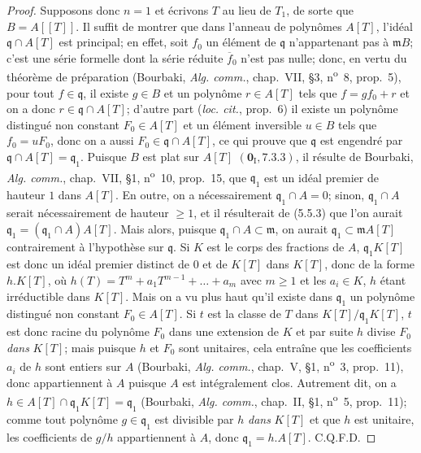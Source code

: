 \begin{proof}
Supposons donc $n=1$ et écrivons $T$ au lieu de $T_1$, de sorte que $B=A[[T]]$. Il
suffit de montrer que dans l'anneau de polynômes $A[T]$, l'idéal
$\mathfrak q\cap A[T]$ est principal;
en effet, soit $f_0$ un élément de $\mathfrak q$ n'appartenant pas à $\mathfrak mB$;
c'est une série formelle dont la série réduite $\overline f_0$ n'est pas nulle; donc,
en vertu du théorème de préparation (Bourbaki, \emph{Alg. comm.}, chap.~VII, \S3,
n\textsuperscript{o}~8, prop.~5), pour tout $f\in\mathfrak q$, il existe $g\in B$ et
un polynôme $r\in A[T]$ tels que $f=gf_0+r$ et on a donc
$r\in\mathfrak q\cap A[T]$; d'autre part (\emph{loc. cit.}, prop.~6) il existe un
polynôme distingué non constant $F_0\in A[T]$ et un élément inversible $u\in B$ tels
que $f_0=uF_0$, donc on a aussi $F_0\in\mathfrak q\cap A[T]$, ce qui prouve que
$\mathfrak q$ est engendré par $\mathfrak q\cap A[T]=\mathfrak q_1$. Puisque $B$
est plat sur $A[T]$ $(\mathbf 0_{\mathrm I}, 7.3.3)$, il résulte de Bourbaki,
\emph{Alg. comm.}, chap.~VII, \S1, n\textsuperscript{o}~10, prop.~15, que
$\mathfrak q_1$ est un idéal premier de hauteur $1$ dans $A[T]$.
En outre, on a nécessairement $\mathfrak q_1\cap A=0$; sinon,
$\mathfrak q_1\cap A$ serait nécessairement de hauteur $\geq1$, et il résulterait de
(5.5.3) que l'on aurait $\mathfrak q_1=(\mathfrak q_1\cap A)A[T]$. Mais alors,
puisque $\mathfrak q_1\cap A\subset\mathfrak m$, on aurait
$\mathfrak q_1\subset\mathfrak mA[T]$ contrairement à l'hypothèse sur
$\mathfrak q$. Si $K$ est le corps des fractions de $A$, $\mathfrak q_1K[T]$ est
donc un idéal premier distinct de $0$ et de $K[T]$ dans $K[T]$, donc de la forme
$h.K[T]$, où $h(T)=T^m+a_1T^{m-1}+\ldots+a_m$ avec $m\geq1$
et les $a_i\in K$, $h$ étant irréductible dans $K[T]$. Mais on a vu plus haut qu'il
existe dans $\mathfrak q_1$ un polynôme distingué non constant $F_0\in A[T]$. Si $t$
est la classe de $T$ dans $K[T]/\mathfrak q_1K[T]$, $t$ est donc racine du polynôme
$F_0$ dans une extension de $K$ et par suite $h$ divise $F_0$ \emph{dans} $K[T]$; mais
puisque $h$ et $F_0$ sont unitaires, cela entraîne que les coefficients $a_i$ de $h$
sont entiers sur $A$ (Bourbaki, \emph{Alg. comm.}, chap.~V, \S1,
n\textsuperscript{o}~3, prop.~11), donc appartiennent à $A$ puisque $A$ est
intégralement clos. Autrement dit, on a $h\in A[T]\cap\mathfrak q_1K[T]=\mathfrak q_1$
(Bourbaki, \emph{Alg. comm.}, chap.~II, \S1, n\textsuperscript{o}~5, prop.~11);
comme tout polynôme $g\in\mathfrak q_1$ est divisible par $h$ \emph{dans} $K[T]$ et que $h$
est unitaire, les coefficients de $g/h$ appartiennent à $A$, donc
$\mathfrak q_1=h.A[T]$. C.Q.F.D.
\end{proof}


